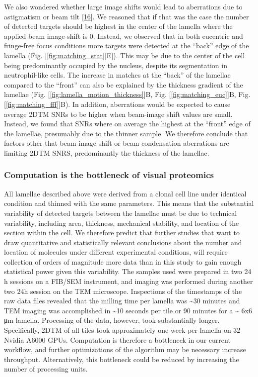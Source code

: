 \documentclass[
]{article}
\begin{document}
We also wondered whether large image shifts would lead to aberrations due to
astigmatism or beam tilt {[}\protect\hyperlink{ref-APSL9LmU}{16}{]}. We reasoned that if
that was the case the number of detected targets should be highest in the center of the
lamella where the applied beam image-shift is 0. Instead, we observed that in
both eucentric and fringe-free focus conditions more targets were detected at the
``back'' edge of the lamella (Fig. {[}\ref{fig:matching_stat}{]}E{]}). This may be due to the center of the cell being predominantly
occupied by the nucleus, despite its segmentation in neutrophil-like cells. The
increase in matches at the ``back'' of the lamellae compared to the ``front'' can also
be explained by the thickness gradient of the lamellae (Fig. {[}\ref{fig:lamella_motion_thickness}{]}B,
Fig. {[}\ref{fig:matching_euc}{]}B, Fig. {[}\ref{fig:matching_fff}{]}B). In addition, aberrations would be expected to cause average 2DTM SNRs to be higher when beam-image shift
values are small. Instead, we found that SNRs where on average the highest at the
``front'' edge of the lamellae, presumably due to the thinner sample. We therefore
conclude that factors other that beam image-shift or beam
condensation aberrations are limiting 2DTM SNRS, predominantly the thickness of
the lamellae.

\hypertarget{computation-is-the-bottleneck-of-visual-proteomics}{%
\subsubsection{Computation is the bottleneck of visual proteomics}\label{computation-is-the-bottleneck-of-visual-proteomics}}

All lamellae described above were derived from a clonal cell line under identical condition and thinned with the same parameters. This means that the substantial variability of detected targets between the lamellae must be due to
technical variability, including area, thickness, mechanical stability, and location of the section within the cell. We therefore predict that further studies that want to draw quantitative and statistically relevant conclusions about the number and location of
molecules under different experimental conditions, will require collection of orders of magnitude more data than in this study to gain enough statistical power given this variability. The samples used were
prepared in two 24 h sessions on a FIB/SEM instrument, and imaging was performed
during another two 24h session on the TEM microscope. Inspections of the
timestamps of the raw data files revealed that the milling time per lamella was
\textasciitilde30 minutes and TEM imaging was accomplished in \textasciitilde10 seconds per tile or 90
minutes for a \textasciitilde{} 6x6 μm lamella. Processing of the data, however, took
substantially longer. Specifically, 2DTM of all tiles took approximately one
week per lamella on 32 Nvidia A6000 GPUs. Computation is therefore a bottleneck in our
current workflow, and further optimizations of the algorithm may be necessary
increase throughput. Alternatively, this bottleneck could be reduced by
increasing the number of processing units.
\end{document}
